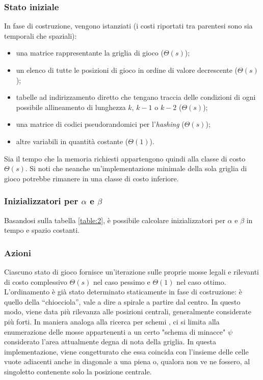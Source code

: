 \documentclass{article}
\begin{document}
\subsubsection{Stato iniziale}

In fase di costruzione, vengono istanziati (i costi riportati tra parentesi
sono sia temporali che spaziali):
\begin{itemize}
  \item una matrice rappresentante la griglia di gioco ($\varTheta(s)$);
  \item un elenco di tutte le posizioni di gioco in ordine di valore decrescente
    ($\varTheta(s)$);
  \item tabelle ad indirizzamento diretto che tengano traccia delle condizioni
    di ogni possibile allineamento di lunghezza $k$, $k - 1$ o $k - 2$
    ($\varTheta(s)$);
  \item una matrice di codici pseudorandomici per l'\emph{hashing}
    ($\varTheta(s)$);
  \item altre variabili in quantità costante ($\varTheta(1)$).
\end{itemize}

Sia il tempo che la memoria richiesti appartengono quindi alla classe di costo
$\varTheta(s)$. Si noti che neanche un'implementazione minimale della sola
griglia di gioco potrebbe rimanere in una classe di costo inferiore. 

\subsubsection{Inizializzatori per $\alpha$ e $\beta$}

Basandosi sulla tabella \ref{table:2}, è possibile calcolare inizializzatori per
$\alpha$ e $\beta$ in tempo e spazio costanti.

\subsubsection{Azioni} \label{pattern-search}

Ciascuno stato di gioco fornisce un'iterazione sulle proprie mosse legali e
rilevanti di costo complessivo $\varTheta(s)$ nel caso pessimo e $\varTheta(1)$
nel caso ottimo. L'ordinamento è già stato determinato staticamente in fase di
costruzione: è quello della ``chiocciola'', vale a dire a spirale a partire dal
centro. In questo modo, viene data più rilevanza alle posizioni centrali,
generalmente considerate più forti. In maniera analoga alla ricerca per schemi
\cite{VANDENHERIK2002277}, ci si limita alla enumerazione delle mosse
appartenenti a un certo "schema di minacce" $\psi$ considerato l'area
attualmente degna di nota della griglia. In questa implementazione, viene
congetturato che essa coincida con l'insieme delle celle vuote adiacenti anche
in diagonale a una piena o, qualora non ve ne fossero, al singoletto contenente
solo la posizione centrale.
\end{document}
